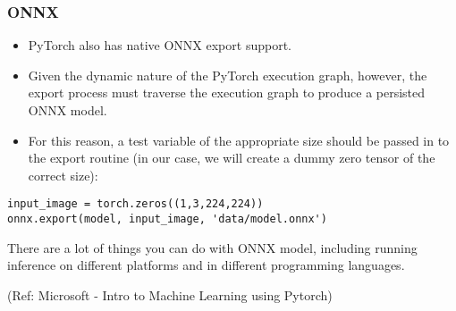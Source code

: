 \begin{frame}[fragile] \frametitle{ONNX}

\begin{itemize}
\item PyTorch also has native ONNX export support. 
\item Given the dynamic nature of the PyTorch execution graph, however, the export process must traverse the execution graph to produce a persisted ONNX model. 
\item For this reason, a test variable of the appropriate size should be passed in to the export routine (in our case, we will create a dummy zero tensor of the correct size):
\end{itemize}


\begin{lstlisting}
input_image = torch.zeros((1,3,224,224))
onnx.export(model, input_image, 'data/model.onnx')
\end{lstlisting}

There are a lot of things you can do with ONNX model, including running inference on different platforms and in different programming languages. 

\tiny{(Ref: Microsoft - Intro to Machine Learning using Pytorch)}
\end{frame}









